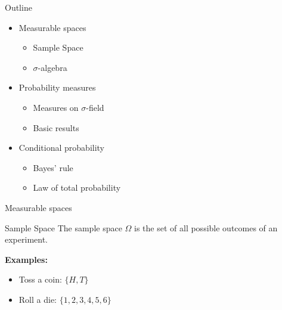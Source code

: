 \documentclass [aspectratio=169]{beamer}
\begin{document}
\begin{frame}{Outline}
    \begin{itemize}
        \item Measurable spaces
        \begin{itemize}
            \item Sample Space
            \item $\sigma$-algebra
        \end{itemize}
        \item Probability measures
              \begin{itemize}
            \item Measures on $\sigma$-field
            \item Basic results
        \end{itemize}
        \item Conditional probability
        \begin{itemize}
            \item Bayes’ rule
            \item Law of total probability

        \end{itemize}
    \end{itemize}
\end{frame}




\begin{frame}{Measurable spaces}
    \begin{block}{Sample Space}
    The sample space $\Omega$ is the set of all possible outcomes of an experiment.
    \end{block}
    \textbf{Examples:}
    \begin{itemize}
        \item Toss a coin: $\{H, T\}$
        \item Roll a die: $\{1, 2, 3, 4, 5, 6\}$
    \end{itemize}
\end{frame}
\end{document}
